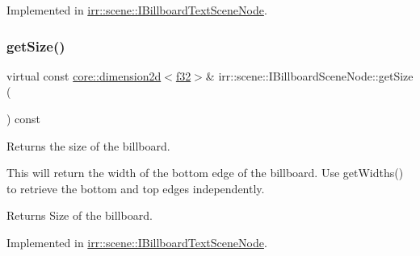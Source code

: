 Implemented in \hyperlink{classirr_1_1scene_1_1IBillboardTextSceneNode_ac142a04e455811d5a3efa47ce2499d18}{irr\+::scene\+::\+I\+Billboard\+Text\+Scene\+Node}.

\mbox{\label{classirr_1_1scene_1_1IBillboardSceneNode_a466cfd24ccb0fb6c2216dbdc7228e3c0}} 
\subsubsection{\texorpdfstring{get\+Size()}{getSize()}\hspace{0.1cm}{\footnotesize\ttfamily [1/2]}}
{\footnotesize\ttfamily virtual const \hyperlink{classirr_1_1core_1_1dimension2d}{core\+::dimension2d}$<$\hyperlink{namespaceirr_a0277be98d67dc26ff93b1a6a1d086b07}{f32}$>$\& irr\+::scene\+::\+I\+Billboard\+Scene\+Node\+::get\+Size (\begin{DoxyParamCaption}{ }\end{DoxyParamCaption}) const\hspace{0.3cm}{\ttfamily [pure virtual]}}



Returns the size of the billboard. 

This will return the width of the bottom edge of the billboard. Use get\+Widths() to retrieve the bottom and top edges independently. \begin{DoxyReturn}{Returns}
Size of the billboard. 
\end{DoxyReturn}


Implemented in \hyperlink{classirr_1_1scene_1_1IBillboardTextSceneNode_aead5178207d887357fb7f3fbddcc51d6}{irr\+::scene\+::\+I\+Billboard\+Text\+Scene\+Node}.

\mbox{\label{classirr_1_1scene_1_1IBillboardSceneNode_a79a636a0da637eaa9c061138f5ef3f68}} 
